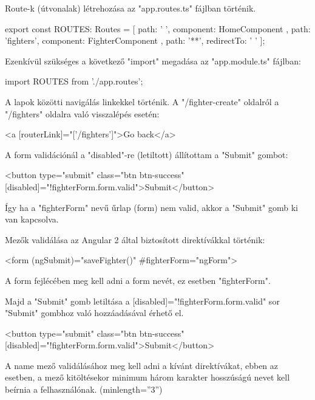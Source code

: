 Route-k (útvonalak) létrehozása az "app.routes.ts" fájlban történik.

\begin{cpp}
export const ROUTES: Routes = [
  { path: ' ', component: HomeComponent },
  { path: 'fighters', component: FighterComponent },
  { path: '**', redirectTo: ' ' }
];
\end{cpp}

Ezenkívül szükséges a következő "import" megadása az "app.module.ts" fájlban:

\begin{cpp}
import { ROUTES } from './app.routes'; 
\end{cpp}

A lapok közötti navigálás linkekkel történik.
A "/fighter-create" oldalról a "/fighters" oldalra való visszalépés esetén:

\begin{cpp}
<a [routerLink]="['/fighters']">Go back</a>
\end{cpp}


A form validációnál a "disabled"-re (letiltott) állítottam a "Submit" gombot:

\begin{cpp}
<button type="submit" class="btn btn-success" 
[disabled]="!fighterForm.form.valid">Submit</button>
\end{cpp}

Így ha a "fighterForm" nevű űrlap (form) nem valid, akkor a "Submit" gomb ki van kapcsolva.

Mezők validálása az Angular 2 által biztosított direktívákkal történik:

\begin{cpp}
<form (ngSubmit)="saveFighter()" #fighterForm="ngForm">
\end{cpp}

A form fejlécében meg kell adni a form nevét, ez esetben "fighterForm".

Majd a "Submit" gomb letiltása a [disabled]="!fighterForm.form.valid" sor "Submit" gombhoz való hozzáadásával érhető el.

\begin{cpp}
<button type="submit" class="btn btn-success" 
[disabled]="!fighterForm.form.valid">Submit</button>
\end{cpp}

A name mező validálásához meg kell adni a kívánt direktívákat, ebben az esetben, a mező kitöltésekor minimum három karakter hosszúságú nevet kell beírnia a felhasználónak. (minlength=”3”)

